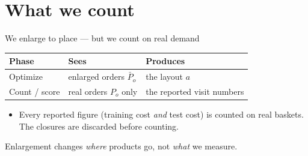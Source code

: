 \documentclass[11pt,aspectratio=169]{beamer}
\newcommand{\kk}{\kappa}
\begin{document}
\section{What we count}
\begin{frame}{We enlarge to place --- but we count on real demand}
  \begin{center}
  \begin{tabular}{@{}lll@{}}
    \toprule
    Phase & Sees & Produces \\
    \midrule
    Optimize & \alert{enlarged} orders $\bar P_o$ & the layout $a$ \\
    Count / score & \alert{real} orders $P_o$ only & the reported visit numbers \\
    \bottomrule
  \end{tabular}
  \end{center}
  \vspace{0.6em}
  \begin{itemize}
    \item Every reported figure (training cost \emph{and} test cost) is counted on
          \alert{real baskets}. The closures are discarded before counting.
  \end{itemize}
  \vspace{0.3em}
  {\footnotesize Enlargement changes \emph{where} products go, not \emph{what} we measure.}
\end{frame}

\end{document}
